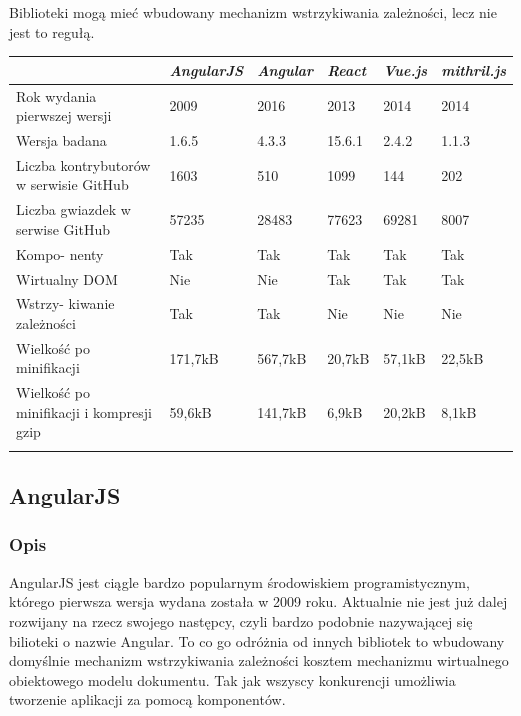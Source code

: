 \documentclass[polish, twoside, 12pt]{mwart}
\begin{document}
Biblioteki mogą mieć wbudowany mechanizm wstrzykiwania zależności, lecz nie jest to regułą. \newline


\begin{center}
  \begin{tabularx}{\textwidth}{|X|X|X|X|X|X|}\hline
    & \emph{AngularJS} & \emph{Angular} & \emph{React} & \emph{Vue.js} & \emph{mithril.js}\\ \hline
    Rok wydania pierwszej wersji & 2009 & 2016 & 2013 & 2014 & 2014 \\ \hline
    Wersja badana & 1.6.5 & 4.3.3 & 15.6.1 & 2.4.2 & 1.1.3 \\ \hline
    Liczba kontrybutorów w serwisie GitHub & 1603 & 510 & 1099 & 144 & 202 \\ \hline
    Liczba gwiazdek w serwise GitHub & 57235 & 28483 & 77623 & 69281 & 8007 \\ \hline
    Kompo- nenty & Tak & Tak & Tak & Tak & Tak \\ \hline
    Wirtualny DOM & Nie & Nie & Tak & Tak & Tak \\ \hline
    Wstrzy- kiwanie zależności & Tak & Tak & Nie & Nie & Nie \\ \hline
    Wielkość po minifikacji & 171,7kB & 567,7kB & 20,7kB & 57,1kB & 22,5kB \\ \hline
    Wielkość po minifikacji i kompresji gzip & 59,6kB & 141,7kB & 6,9kB & 20,2kB & 8,1kB \\ \hline
    \caption{Porównanie bibliotek}
  \end{tabularx}
\end{center}

\subsection{AngularJS}

\subsubsection{Opis}

AngularJS \cite{angularjs} jest ciągle bardzo popularnym środowiskiem programistycznym, którego pierwsza wersja wydana została w 2009 roku. Aktualnie nie jest już dalej rozwijany na rzecz swojego następcy, czyli bardzo podobnie nazywającej się bilioteki o nazwie Angular. To co go odróżnia od innych bibliotek to wbudowany domyślnie mechanizm wstrzykiwania zależności kosztem mechanizmu wirtualnego obiektowego modelu dokumentu. Tak jak wszyscy konkurencji umożliwia tworzenie aplikacji za pomocą komponentów.
\end{document}
